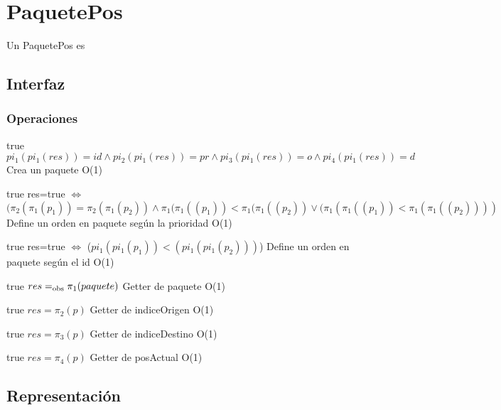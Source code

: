 \section{PaquetePos}

Un PaquetePos es

\subsection{Interfaz}



\subsubsection*{Operaciones}

 {true}
 {$pi_1(pi_1(res))=id \land pi_2(pi_1(res))=pr \land pi_3(pi_1(res))=o \land pi_4(pi_1(res))=d$}
 {Crea un paquete}
 {O(1)}
 {}
 
 {true}
 {res=true $\iff$ $(\pi_2(\pi_1(p_1)) = \pi_2(\pi_1(p_2)) \land \pi_1(\pi_1((p_1)) < \pi_1(\pi_1((p_2)) \lor (\pi_1(\pi_1((p_1)) < \pi_1(\pi_1((p_2))))$}
 {Define un orden en paquete seg\'un la prioridad}
 {O(1)}
 {}
 
 {true}
 {res=true $\iff$ ($pi_1(pi_1(p_1))<(pi_1(pi_1(p_2)))$)}
 {Define un orden en paquete seg\'un el id}
 {O(1)}
 {}
 
 {true}
 {$res =_{\mathrm{obs}} \pi_1(paquete)$}
 {Getter de paquete}
 {O(1)}
 {}
 
 {true}
 {$res = \pi_2(p)$}
 {Getter de indiceOrigen}
 {O(1)}
 {}
 
 {true}
 {$res = \pi_3(p)$}
 {Getter de indiceDestino}
 {O(1)}
 {}  
 
 {true}
 {$res = \pi_4(p)$}
 {Getter de posActual}
 {O(1)}
 {} 
  
\subsection{Representación}



